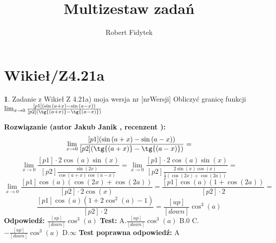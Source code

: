 \documentclass[12pt, a4paper]{article}
\title{Multizestaw zadań}
\author{Robert Fidytek}
\date{}
\theoremstyle{definition} %
\newtheorem{zad}{}
\newcommand{\kategoria}[1]{\section{#1}} %
\newcommand{\zadStart}[1]{\begin{zad}#1\newline} %
\newcommand{\zadStop}{\end{zad}}   %
\newcommand{\rozwStart}[2]{\noindent \textbf{Rozwiązanie (autor #1 , recenzent #2): }\newline} %
\newcommand{\rozwStop}{\newline}                                            %
\newcommand{\odpStart}{\noindent \textbf{Odpowiedź:}\newline}    %
\newcommand{\odpStop}{\newline}                                             %
\newcommand{\testStart}{\noindent \textbf{Test:}\newline} %
\newcommand{\testStop}{\newline} %
\newcommand{\kluczStart}{\noindent \textbf{Test poprawna odpowiedź:}\newline} %
\newcommand{\kluczStop}{\newline} %
\begin{document}
\maketitle


\kategoria{Wikieł/Z4.21a}
\zadStart{Zadanie z Wikieł Z 4.21a) moja wersja nr [nrWersji]}
Obliczyć granicę funkcji $\lim_{x \to 0} \frac{[p1](\sin{(a+x)}-\sin{(a-x)})}{[p2](\tg{(a+x)}-\tg{(a-x)})}$
\zadStop
\rozwStart{Jakub Janik}{}
$$\lim_{x \to 0} \frac{[p1](\sin{(a+x)}-\sin{(a-x)})}{[p2](\tg{(a+x)}-\tg{(a-x)})}=$$
$$\lim_{x \to 0} \frac{[p1]\cdot 2\cos{(a)}\sin{(x)}}{[p2]\frac{\sin{(2x)}}{\cos{(a+x)}\cos{(a-x)}}}=\lim_{x \to 0} \frac{[p1]\cdot 2\cos{(a)}\sin{(x)}}{[p2]\frac{2\sin{(x)}\cos{(x)}}{\frac{1}{2}(\cos{(2x)}+\cos{(2a)})}}=$$
$$\lim_{x \to 0} \frac{[p1]\cos{(a)}(\cos{(2x)}+\cos{(2a)})}{[p2]\cdot2\cos{(x)}}=\frac{[p1]\cos{(a)}(1+\cos{(2a)})}{[p2]\cdot2}=$$
$$\frac{[p1]\cos{(a)}(1+2\cos^2{(a)}-1)}{[p2]\cdot2}=\frac{[up]}{[down]}\cos^3{(a)}$$
\rozwStop
\odpStart
$\frac{[up]}{[down]}\cos^3{(a)}$
\odpStop
\testStart
A.$\frac{[up]}{[down]}\cos^3{(a)}$
B.$0$
C.$-\frac{[up]}{[down]}\cos^3{(a)}$
D.$\infty$
\testStop
\kluczStart
A
\kluczStop
\end{document}
